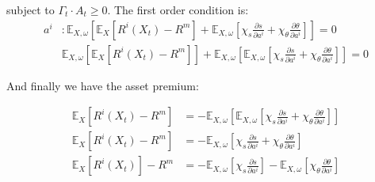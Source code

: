 \begin{flushleft}
{\small subject to $\Gamma_{t}\cdot A_{t}\geq0$. The first order condition
is:}
\begin{align*}
a^{i} & :\mathbb{E}_{X,\omega}\left[\mathbb{E}_{X}\left[R^{i}\left(X_{t}\right)-R^{m}\right]+\mathbb{E}_{X,\omega}\left[\chi_{s}\frac{\partial s}{\partial a^{i}}+\chi_{\theta}\frac{\partial\theta}{\partial a^{i}}\right]\right]=0\\
 & \mathbb{E}_{X,\omega}\left[\mathbb{E}_{X}\left[R^{i}\left(X_{t}\right)-R^{m}\right]\right]+\mathbb{E}_{X,\omega}\left[\mathbb{E}_{X,\omega}\left[\chi_{s}\frac{\partial s}{\partial a^{i}}+\chi_{\theta}\frac{\partial\theta}{\partial a^{i}}\right]\right]=0
\end{align*}
\par\end{flushleft}

{\small And finally we have the asset premium:}{\small\par}
\begin{center}
\begin{align*}
\mathbb{E}_{X}\left[R^{i}\left(X_{t}\right)-R^{m}\right] & =-\mathbb{E}_{X,\omega}\left[\mathbb{E}_{X,\omega}\left[\chi_{s}\frac{\partial s}{\partial a^{i}}+\chi_{\theta}\frac{\partial\theta}{\partial a^{i}}\right]\right]\\
\mathbb{E}_{X}\left[R^{i}\left(X_{t}\right)-R^{m}\right] & =-\mathbb{E}_{X,\omega}\left[\chi_{s}\frac{\partial s}{\partial a^{i}}+\chi_{\theta}\frac{\partial\theta}{\partial a^{i}}\right]\\
\mathbb{E}_{X}\left[R^{i}\left(X_{t}\right)\right]-R^{m} & =-\mathbb{E}_{X,\omega}\left[\chi_{s}\frac{\partial s}{\partial a^{i}}\right]-\mathbb{E}_{X,\omega}\left[\chi_{\theta}\frac{\partial\theta}{\partial a^{i}}\right]
\end{align*}
\par\end{center}
